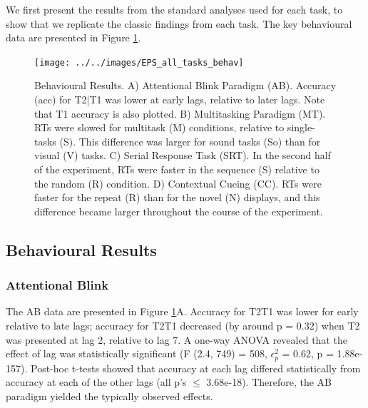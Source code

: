 \documentclass[
  man]{apa6}
\begin{document}
\label{sec:Results}

We first present the results from the standard analyses used for each task, to show that we replicate the classic findings from each task. The key behavioural data are presented in Figure \ref{fig:behavResults}.

\begin{figure}

{\centering \texttt{[image: ../../images/EPS\_all\_tasks\_behav]} 

}

\caption{Behavioural Results. A) Attentional Blink Paradigm (AB). Accuracy (acc) for T2|T1 was lower at early lags, relative to later lags. Note that T1 accuracy is also plotted. B) Multitasking Paradigm (MT). RTs were slowed for multitask (M) conditions, relative to single-tasks (S). This difference was larger for sound tasks (So) than for visual (V) tasks. C) Serial Response Task (SRT). In the second half of the experiment, RTs were faster in the sequence (S) relative to the random (R) condition. D) Contextual Cueing (CC). RTs were faster for the repeat (R) than for the novel (N) displays, and this difference became larger throughout the course of the experiment.}\label{fig:behavResults}
\end{figure}

\hypertarget{behavioural-results}{%
\subsection{Behavioural Results}\label{behavioural-results}}

\hypertarget{attentional-blink-1}{%
\subsubsection{Attentional Blink}\label{attentional-blink-1}}

\label{sec:ABRes}

The AB data are presented in Figure \ref{fig:behavResults}A. Accuracy for T2\textbar T1 was lower for early relative to late lags; accuracy for T2\textbar T1 decreased (by around p = 0.32) when T2 was presented at lag 2, relative to lag 7. A one-way ANOVA revealed that the effect of lag was statistically significant (F (2.4, 749) = 508, \(\epsilon_{p}^2\) = 0.62, p = 1.88e-157). Post-hoc t-tests showed that accuracy at each lag differed statistically from accuracy at each of the other lags (all p's \(\leq\) 3.68e-18). Therefore, the AB paradigm yielded the typically observed effects.
\end{document}
